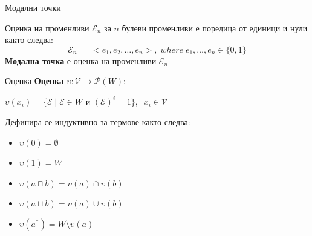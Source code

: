 \documentclass[14pt, aspectratio=169]{beamer}
\newcommand\p{\mathcal{P}}
\newcommand\V{\mathcal{V}}
\newcommand\E{\mathcal{E}}
\begin{document}


\begin{frame}{Модални точки}
	\begin{definition}
		Оценка на променливи $\E_n$ за $n$ булеви променливи е поредица от единици и нули както следва:
		\begin{equation*}
			\E_n = \; < e_1, e_2, \ldots , e_n >, \; where \; e_1, \ldots, e_n \in \{0, 1 \}
		\end{equation*}
		\textbf{Модална точка} е оценка на променливи $\E_n$
	\end{definition}
\end{frame}

%

\begin{frame}{Оценка}
	\textbf{Оценка $\upsilon : \V \rightarrow \p(W)$}:
	\begin{center}
		$\upsilon(x_i) = \{ \E \mid \E \in W$ и $(\E)^i = 1 \}, \;\; x_i \in \V$
	\end{center}
	Дефинира се индуктивно за термове както следва:
	\begin{itemize}
		\item $\upsilon(0) = \emptyset$
		\item $\upsilon(1) = W$
		\item $\upsilon(a \sqcap b) = \upsilon(a) \cap \upsilon(b)$
		\item $\upsilon(a \sqcup b) = \upsilon(a) \cup \upsilon(b)$
		\item $\upsilon(a^*) = W \setminus \upsilon(a)$
	\end{itemize}
\end{frame}
\end{document}
